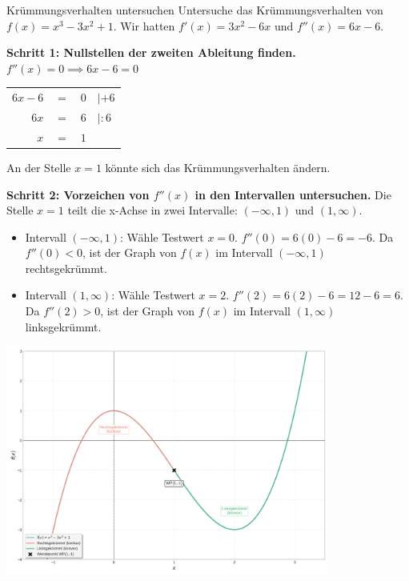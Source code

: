 \begin{beispielumgebung}{Krümmungsverhalten untersuchen}
Untersuche das Krümmungsverhalten von $f(x) = x^3 - 3x^2 + 1$.
Wir hatten $f'(x) = 3x^2 - 6x$ und $f''(x) = 6x - 6$.

\textbf{Schritt 1: Nullstellen der zweiten Ableitung finden.}
$f''(x) = 0 \implies 6x - 6 = 0$
\begin{center}
\begin{tabular}{r @{\,} c @{\,} l @{\quad\quad} l}
$6x - 6$ & $=$ & $0$ & $|+6$ \\
$6x$ & $=$ & $6$ & $|:6$ \\
$x$ & $=$ & $1$ & \\
\end{tabular}
\end{center}
An der Stelle $x=1$ könnte sich das Krümmungsverhalten ändern.

\textbf{Schritt 2: Vorzeichen von $f''(x)$ in den Intervallen untersuchen.}
Die Stelle $x=1$ teilt die x-Achse in zwei Intervalle: $(-\infty, 1)$ und $(1, \infty)$.
\begin{itemize}
    \item Intervall $(-\infty, 1)$: Wähle Testwert $x=0$. $f''(0) = 6(0) - 6 = -6$.
    Da $f''(0) < 0$, ist der Graph von $f(x)$ im Intervall $(-\infty, 1)$ rechtsgekrümmt.
    \item Intervall $(1, \infty)$: Wähle Testwert $x=2$. $f''(2) = 6(2) - 6 = 12 - 6 = 6$.
    Da $f''(2) > 0$, ist der Graph von $f(x)$ im Intervall $(1, \infty)$ linksgekrümmt.
\end{itemize}
\begin{center}
    \includegraphics[width=0.8\textwidth]{grafiken/Differentialrechnung_Kruemmung.png}
    \label{fig:kruemmung_bsp_neu}
\end{center}


\end{beispielumgebung}

